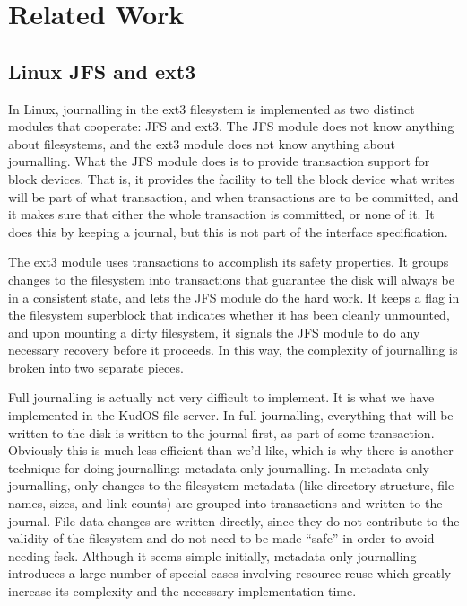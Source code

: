\section{Related Work}
\label{sec:related}

\subsection{Linux JFS and ext3}

In Linux, journalling in the ext3 filesystem is implemented as two distinct
modules that cooperate: JFS and ext3. The JFS module does not know anything
about filesystems, and the ext3 module does not know anything about journalling.
What the JFS module does is to provide transaction support for block devices.
That is, it provides the facility to tell the block device what writes will be
part of what transaction, and when transactions are to be committed, and it
makes sure that either the whole transaction is committed, or none of it. It
does this by keeping a journal, but this is not part of the interface
specification.

The ext3 module uses transactions to accomplish its safety properties. It groups
changes to the filesystem into transactions that guarantee the disk will always
be in a consistent state, and lets the JFS module do the hard work. It keeps a
flag in the filesystem superblock that indicates whether it has been cleanly
unmounted, and upon mounting a dirty filesystem, it signals the JFS module to do
any necessary recovery before it proceeds. In this way, the complexity of
journalling is broken into two separate pieces.

Full journalling is actually not very difficult to implement. It is what we have
implemented in the KudOS file server. In full journalling, everything that will
be written to the disk is written to the journal first, as part of some
transaction. Obviously this is much less efficient than we'd like, which is why
there is another technique for doing journalling: metadata-only journalling. In
metadata-only journalling, only changes to the filesystem metadata (like
directory structure, file names, sizes, and link counts) are grouped into
transactions and written to the journal. File data changes are written directly,
since they do not contribute to the validity of the filesystem and do not need
to be made ``safe'' in order to avoid needing fsck. Although it seems simple
initially, metadata-only journalling introduces a large number of special cases
involving resource reuse which greatly increase its complexity and the necessary
implementation time.

